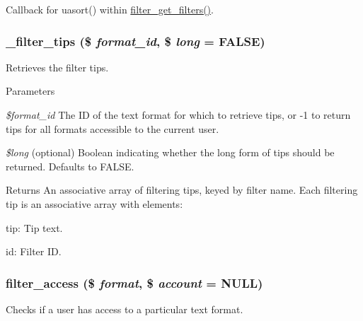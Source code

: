 Callback for uasort() within \hyperlink{filter_8module_a9a4d34bbacb92f82ae844fefbd20d32d}{filter\_\-get\_\-filters()}. \hypertarget{filter_8module_a3b16812bade6a3a5fa942913150249b9}{
\subsubsection[{\_\-filter\_\-tips}]{\setlength{\rightskip}{0pt plus 5cm}\_\-filter\_\-tips (\$ {\em format\_\-id}, \/  \$ {\em long} = {\ttfamily FALSE})}}
\label{filter_8module_a3b16812bade6a3a5fa942913150249b9}
Retrieves the filter tips.


\begin{DoxyParams}{Parameters}
\item[{\em \$format\_\-id}]The ID of the text format for which to retrieve tips, or -\/1 to return tips for all formats accessible to the current user. \item[{\em \$long}](optional) Boolean indicating whether the long form of tips should be returned. Defaults to FALSE.\end{DoxyParams}
\begin{DoxyReturn}{Returns}
An associative array of filtering tips, keyed by filter name. Each filtering tip is an associative array with elements:
\begin{DoxyItemize}
\item tip: Tip text.
\item id: Filter ID. 
\end{DoxyItemize}
\end{DoxyReturn}
\hypertarget{filter_8module_aff74c90622b601df8e088f6b5c125bb7}{
\subsubsection[{filter\_\-access}]{\setlength{\rightskip}{0pt plus 5cm}filter\_\-access (\$ {\em format}, \/  \$ {\em account} = {\ttfamily NULL})}}
\label{filter_8module_aff74c90622b601df8e088f6b5c125bb7}
Checks if a user has access to a particular text format.


